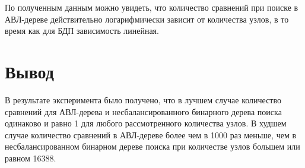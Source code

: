 По полученным данным можно увидеть, что количество сравнений при поиске в АВЛ-дереве действительно логарифмически зависит от количества узлов, в то время как для БДП зависимость линейная.

\newpage
\section*{Вывод}

В результате эксперимента было получено, что в лучшем случае количество сравнений для АВЛ-дерева и несбалансированного бинарного дерева поиска одинаково и равно 1 для любого рассмотренного количества узлов.
В худшем случае количество сравнений в АВЛ-дереве более чем в 1000 раз меньше, чем в несбалансированном бинарном дереве поиска при количестве узлов большем или равном 16388.